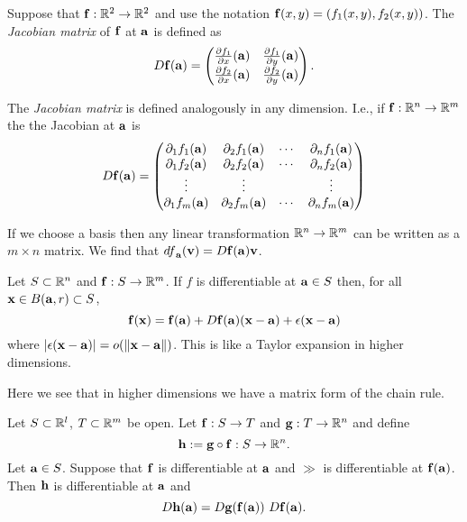 \begin{definition}
    Suppose that \(\ff: \bR^2 \to \bR^2\) and use the notation \(\ff(x,y) = (f_1(x,y),f_2(x,y))\).
    The \emph{Jacobian matrix} of \(\ff\) at \(\aa\) is defined as
    \[
        D\ff(\aa) =
        \begin{pmatrix}
            \frac{\partial f_1}{\partial x} (\aa) & \frac{\partial f_1}{\partial y} (\aa) \\[2pt]
            \frac{\partial f_2}{\partial x} (\aa) & \frac{\partial f_2}{\partial y} (\aa)
        \end{pmatrix}.
    \]
\end{definition}

\begin{remark*}
    The \emph{Jacobian matrix} is defined analogously in any dimension.
    I.e., if \(\ff : \bR^n \to \bR^m\) the the Jacobian at \(\aa\) is
    \[
        D\ff(\aa) =
        \begin{pmatrix}
            \partial_1 f_1 (\aa) & \partial_2 f_1 (\aa) & \cdots & \partial_n f_1 (\aa) \\
            \partial_1 f_2 (\aa) & \partial_2 f_2 (\aa) & \cdots & \partial_n f_2 (\aa) \\
            \vdots               & \vdots               &        & \vdots               \\
            \partial_1 f_m (\aa) & \partial_2 f_m (\aa) & \cdots & \partial_n f_m (\aa)
        \end{pmatrix}
    \]
\end{remark*}


If we choose a basis then any linear transformation \(\bR^n \to \bR^m\) can be written as a \(m \times n\) matrix.
We find that \( {df}_{\aa}(\vv ) = D\ff(\aa) \vv\).

Let \(S\subset \bR^n\) and \(\ff : S \to \bR^m\).
If \(f\) is differentiable at \(\aa \in S\) then, for all  \(\xx\in B(\aa,r) \subset S\),
\[
    \ff(\xx) = \ff(\aa) +  D\ff(\aa) (\xx-\aa) + \epsilon(\xx-\aa)
\]
where \(\abs{\epsilon(\xx-\aa)} = \littleo{\norm{\xx-\aa}}\).
This is like a Taylor expansion in higher dimensions.

Here we see that in higher dimensions we have a matrix form of the chain rule.

\begin{theorem}
    \label{thm:jacobian-chain}
    Let \(S\subset \bR^l\), \(T\subset \bR^m\) be open.
    Let \(\ff: S \to T\) and \(\gg:T \to \bR^n\) and define
    \[
        \hh := \gg \circ \ff : S \to \bR^n.
    \]
    Let  \(\aa\in S\). Suppose that \(\ff\) is differentiable at \(\aa\) and \(\gg\) is differentiable at \(\ff(\aa)\).
    Then \(\hh\) is differentiable at \(\aa\) and
    \[
        D\hh(\aa) = D\gg(\ff(\aa)) \ D\ff(\aa).
    \]
\end{theorem}


